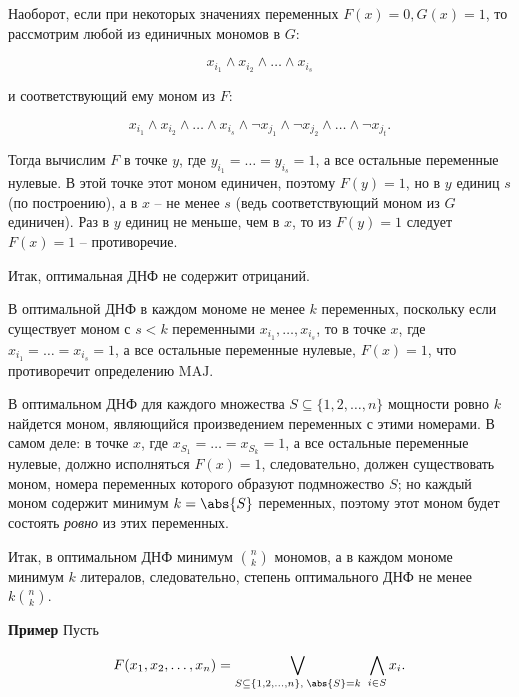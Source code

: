 			Наоборот, если при некоторых значениях переменных $F(x) = 0, G(x) = 1$, то рассмотрим любой из единичных мономов в $G$:

			\begin{equation*}
				x_{i_1} \land x_{i_2} \land \dots \land x_{i_s}
			\end{equation*}

			и соответствующий ему моном из $F$:

			\begin{equation*}
				x_{i_1} \land x_{i_2} \land \dots \land x_{i_s} \land \neg x_{j_1} \land \neg x_{j_2} \land \dots \land \neg x_{j_t}.
			\end{equation*}

			Тогда вычислим $F$ в точке $y$, где $y_{i_1} = \dots = y_{i_s} = 1$, а все остальные переменные нулевые. В этой точке этот моном единичен, поэтому $F(y) = 1$, но в $y$ единиц $s$ (по построению), а в $x$ -- не менее $s$ (ведь соответствующий моном из $G$ единичен). Раз в $y$ единиц не меньше, чем в $x$, то из $F(y) = 1$ следует $F(x) = 1$ -- противоречие.

			Итак, оптимальная ДНФ не содержит отрицаний.

			В оптимальной ДНФ в каждом мономе не менее $k$ переменных, поскольку если существует моном с $s < k$ переменными $x_{i_1}, \dots, x_{i_s}$, то в точке $x$, где $x_{i_1} = \dots = x_{i_s} = 1$, а все остальные переменные нулевые, $F(x) = 1$, что противоречит определению $\mathrm{MAJ}$.

			В оптимальном ДНФ для каждого множества $S \subseteq \{1, 2, \dots, n\}$ мощности ровно $k$ найдется моном, являющийся произведением переменных с этими номерами. В самом деле: в точке $x$, где $x_{S_1} = \dots = x_{S_k} = 1$, а все остальные переменные нулевые, должно исполняться $F(x) = 1$, следовательно, должен существовать моном, номера переменных которого образуют подмножество $S$; но каждый моном содержит минимум $k = \abs{S}$ переменных, поэтому этот моном будет состоять \textit{ровно} из этих переменных.

			Итак, в оптимальном ДНФ минимум $\binom{n}{k}$ мономов, а в каждом мономе минимум $k$ литералов, следовательно, степень оптимального ДНФ не менее $k \binom{n}{k}$.

		\textbf{Пример}
			Пусть

			\begin{equation*}
				F(x_1, x_2, \dots, x_n) = \bigvee_{S \subseteq \{1, 2, \dots, n\}, \; \abs{S} = k} \ \bigwedge_{i \in S} x_i.
			\end{equation*}

